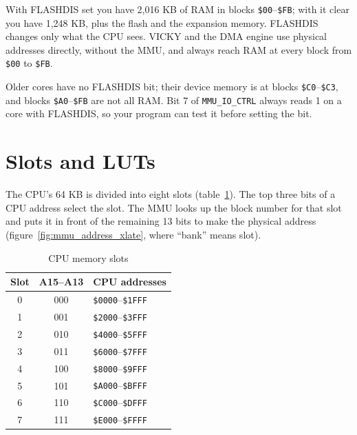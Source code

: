 With FLASHDIS set you have 2,016 KB of RAM in blocks \verb+$00+--\verb+$FB+; with it clear you have 1,248 KB, plus the flash and the expansion memory. FLASHDIS changes only what the CPU sees. VICKY and the DMA engine use physical addresses directly, without the MMU, and always reach RAM at every block from \verb+$00+ to \verb+$FB+.

\begin{note}
    Older cores have no FLASHDIS bit; their device memory is at blocks \verb+$C0+--\verb+$C3+, and blocks \verb+$A0+--\verb+$FB+ are not all RAM. Bit 7 of \verb+MMU_IO_CTRL+ always reads 1 on a core with FLASHDIS, so your program can test it before setting the bit.
\end{note}

\section{Slots and LUTs}

The CPU's 64 KB is divided into eight slots (table~\ref{tab:mem_slots}). The top three bits of a CPU address select the slot. The MMU looks up the block number for that slot and puts it in front of the remaining 13 bits to make the physical address (figure~\ref{fig:mmu_address_xlate}, where ``bank'' means slot).

\begin{table}[ht]
    \begin{center}
        \begin{tabular}{|c|c|l|} \hline
            Slot & A15--A13 & CPU addresses \\ \hline\hline
            0 & 000 & \verb+$0000+--\verb+$1FFF+ \\ \hline
            1 & 001 & \verb+$2000+--\verb+$3FFF+ \\ \hline
            2 & 010 & \verb+$4000+--\verb+$5FFF+ \\ \hline
            3 & 011 & \verb+$6000+--\verb+$7FFF+ \\ \hline
            4 & 100 & \verb+$8000+--\verb+$9FFF+ \\ \hline
            5 & 101 & \verb+$A000+--\verb+$BFFF+ \\ \hline
            6 & 110 & \verb+$C000+--\verb+$DFFF+ \\ \hline
            7 & 111 & \verb+$E000+--\verb+$FFFF+ \\ \hline
        \end{tabular}
    \end{center}
    \caption{CPU memory slots}
    \label{tab:mem_slots}
\end{table}

